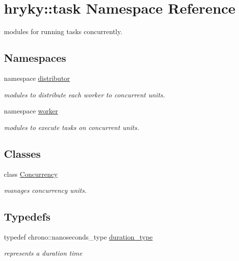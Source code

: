 \hypertarget{namespacehryky_1_1task}{\section{hryky\-:\-:task Namespace Reference}
\label{namespacehryky_1_1task}
}


modules for running tasks concurrently.  


\subsection*{Namespaces}
\begin{DoxyCompactItemize}
\item 
namespace \hyperlink{namespacehryky_1_1task_1_1distributor}{distributor}
\begin{DoxyCompactList}\small\item\em modules to distribute each worker to concurrent units. \end{DoxyCompactList}\item 
namespace \hyperlink{namespacehryky_1_1task_1_1worker}{worker}
\begin{DoxyCompactList}\small\item\em modules to execute tasks on concurrent units. \end{DoxyCompactList}\end{DoxyCompactItemize}
\subsection*{Classes}
\begin{DoxyCompactItemize}
\item 
class \hyperlink{classhryky_1_1task_1_1_concurrency}{Concurrency}
\begin{DoxyCompactList}\small\item\em manages concurrency units. \end{DoxyCompactList}\end{DoxyCompactItemize}
\subsection*{Typedefs}
\begin{DoxyCompactItemize}
\item 
\hypertarget{namespacehryky_1_1task_ab22f4f47e2ef029ecd5373ffbaba40cf}{typedef chrono\-::nanoseconds\-\_\-type \hyperlink{namespacehryky_1_1task_ab22f4f47e2ef029ecd5373ffbaba40cf}{duration\-\_\-type}}\label{namespacehryky_1_1task_ab22f4f47e2ef029ecd5373ffbaba40cf}

\begin{DoxyCompactList}\small\item\em represents a duration time \end{DoxyCompactList}\end{DoxyCompactItemize}
